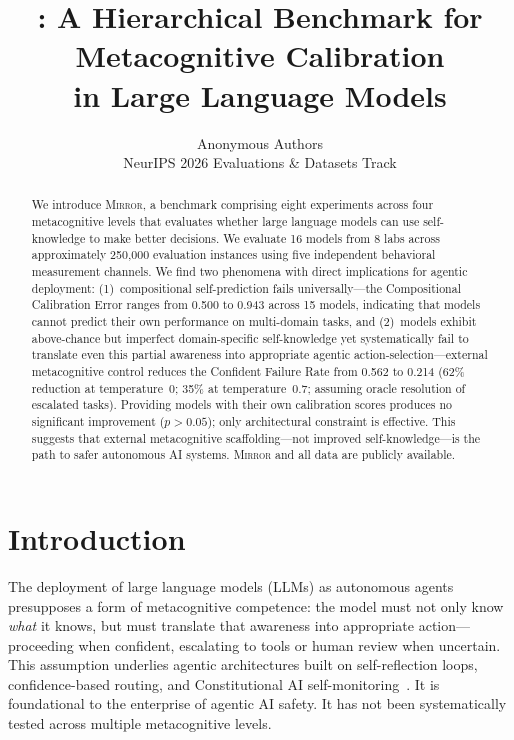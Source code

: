 \documentclass[10pt]{article}
\title{\mirror{}: A Hierarchical Benchmark for Metacognitive Calibration\\in Large Language Models}
\author{
  Anonymous Authors \\
  NeurIPS 2026 Evaluations \& Datasets Track
}
\date{}
\newcommand{\mirror}{\textsc{Mirror}}
\begin{document}
\maketitle

\begin{abstract}
We introduce \mirror{}, a benchmark comprising eight experiments across four
metacognitive levels that evaluates whether large language models can use
self-knowledge to make better decisions. We evaluate 16 models from 8 labs across
approximately 250,000 evaluation instances using five independent behavioral
measurement channels. We find two phenomena with direct implications for agentic
deployment: (1)~compositional self-prediction fails universally---the Compositional
Calibration Error ranges from 0.500 to 0.943 across 15 models, indicating that
models cannot predict their own performance on multi-domain tasks, and (2)~models
exhibit above-chance but imperfect domain-specific self-knowledge yet systematically
fail to translate even this partial awareness into appropriate agentic
action-selection---external metacognitive control reduces the Confident Failure Rate
from 0.562 to 0.214 (62\% reduction at temperature~0; 35\% at temperature~0.7; assuming oracle resolution of escalated tasks).
Providing models with their own calibration scores produces no significant
improvement ($p > 0.05$); only architectural constraint is effective. This suggests
that external metacognitive scaffolding---not improved self-knowledge---is the path
to safer autonomous AI systems. \mirror{} and all data are publicly available.
\end{abstract}

\section{Introduction}
\label{sec:intro}

The deployment of large language models (LLMs) as autonomous agents presupposes a
form of metacognitive competence: the model must not only know \textit{what} it
knows, but must translate that awareness into appropriate action---proceeding when
confident, escalating to tools or human review when uncertain. This assumption
underlies agentic architectures built on self-reflection loops, confidence-based
routing, and Constitutional AI self-monitoring~\citep{perez2022sycophancy}. It is
foundational to the enterprise of agentic AI safety. It has not been
systematically tested across multiple metacognitive levels.
\end{document}
